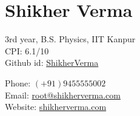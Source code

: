 \documentclass[a4paper]{article}
\author{Shikher Verma}
\begin{document}
\section*{\huge\textbf Shikher Verma}
\begin{minipage}{.45\linewidth}
	\begin{flushleft}
		3rd year, B.S. Physics, IIT Kanpur\\
		CPI: 6.1/10\\
		Github id: \href{https://github.com/ShikherVerma}{ShikherVerma}\\
	\end{flushleft}
\end{minipage}
\hfill
\begin{minipage}{.45\linewidth}
	\begin{flushright}
		Phone: $(+91)9455555002$\\
		Email: \href{mailto:root@shikherverma.com}{root@shikherverma.com}\\
		Website: \href{http://shikherverma.com}{shikherverma.com}\\
	\end{flushright}
\end{minipage}

\end{document}
